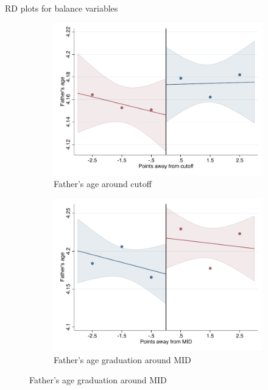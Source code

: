 \documentclass[notes,11pt, aspectratio=169]{beamer}
\begin{document}
\begin{frame}{RD plots for balance variables}
\hyperlink{balance_rd_plot}{}
\begin{figure}

    \begin{subfigure}{0.45\textwidth}
        \centering
        \caption{Father's age around cutoff}
        \includegraphics[width=\textwidth]{04_Figures/rd_plot_tau_edad_pad_IPN3.pdf}
    \end{subfigure}
    \begin{subfigure}{0.45\textwidth}
        \centering
        \caption{Father's age graduation around MID}
        \includegraphics[width=\textwidth]{04_Figures/rd_plot_mid_edad_pad_IPN3.pdf}
    \end{subfigure}
    
\end{figure}
\end{frame}
\end{document}
